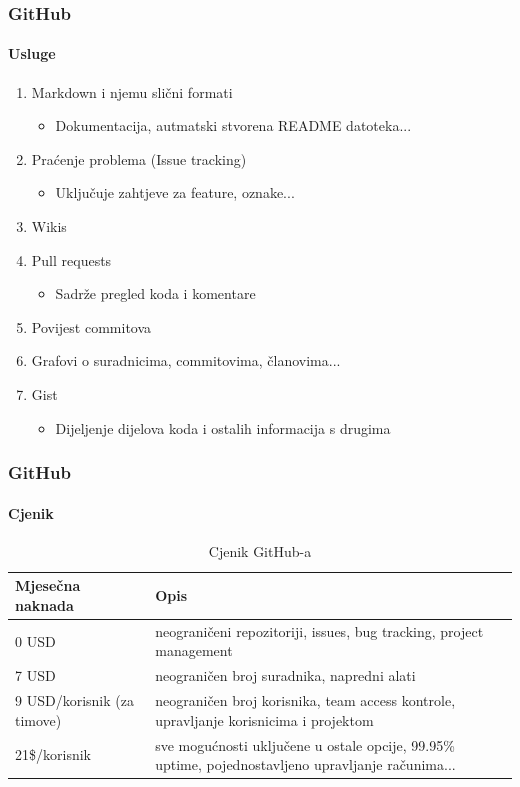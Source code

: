 \documentclass[12pt, hyperref={unicode}]{beamer}
\begin{document}
\begin{frame}
	\frametitle{GitHub}
	\framesubtitle{Usluge}
	\setlength{\leftmargini}{0in}
	\pause
	\begin{enumerate}
		\item Markdown i njemu slični formati
		\begin{itemize}
			\item Dokumentacija, autmatski stvorena README datoteka...
		\end{itemize}
		\pause
		\item Praćenje problema (Issue tracking)
		\begin{itemize}
			\item Uključuje zahtjeve za feature, oznake...
		\end{itemize}
		\pause
		\item Wikis
		\pause
		\item Pull requests
		\begin{itemize}
			\item Sadrže pregled koda i komentare
		\end{itemize}
		\pause
		\item Povijest commitova
		\pause
		\item Grafovi o suradnicima, commitovima, članovima...
		\pause
		\item Gist
		\begin{itemize}
			\item Dijeljenje dijelova koda i ostalih informacija s drugima
		\end{itemize}
	\end{enumerate}
\end{frame}

\begin{frame}[t]
	\frametitle{GitHub}
	\framesubtitle{Cjenik}
	\pause
	\begin{table}
		\footnotesize
		\begin{center}
		\caption{Cjenik GitHub-a}
		\begin{tabular}{|p{4cm}||p{5cm}|}
			\hline
			Mjesečna naknada & Opis \\
			\hline
			0 USD & neograničeni repozitoriji, issues, bug tracking, project management \\
			\hline
			7 USD & neograničen broj suradnika, napredni alati \\
			\hline
			9 USD/korisnik (za timove) & neograničen broj korisnika, team access kontrole, upravljanje korisnicima i projektom \\
			\hline
			21\$/korisnik & sve mogućnosti uključene u ostale opcije, 99.95\% uptime, pojednostavljeno upravljanje računima... \\
			\hline
		\end{tabular}
		\end{center}
	\end{table}
\end{frame}
\end{document}
